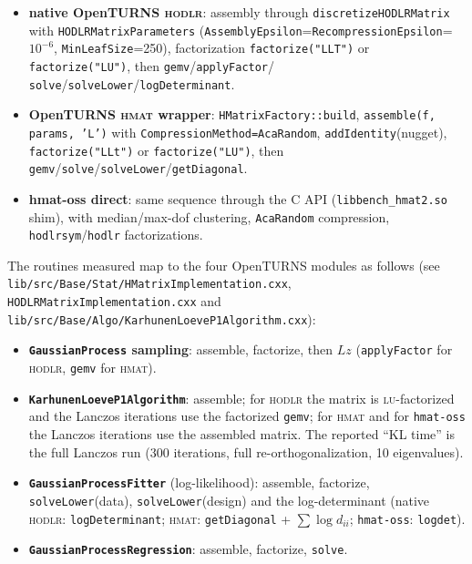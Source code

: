 \documentclass[11pt]{article}
\newcommand{\ot}{OpenTURNS}
\begin{document}
\begin{itemize}
  \item \textbf{native \ot{} \textsc{hodlr}}: assembly through
        \texttt{discretizeHODLRMatrix} with \texttt{HODLRMatrixParameters}
        (\texttt{AssemblyEpsilon}=\texttt{RecompressionEpsilon}=$10^{-6}$,
        \texttt{MinLeafSize}=250), factorization \texttt{factorize("LLT")} or
        \texttt{factorize("LU")}, then \texttt{gemv}/\texttt{applyFactor}/
        \texttt{solve}/\texttt{solveLower}/\texttt{logDeterminant}.
  \item \textbf{\ot{} \textsc{hmat} wrapper}: \texttt{HMatrixFactory::build},
        \texttt{assemble(f, params, 'L')} with
        \texttt{CompressionMethod=AcaRandom}, \texttt{addIdentity}(nugget),
        \texttt{factorize("LLt")} or \texttt{factorize("LU")}, then
        \texttt{gemv}/\texttt{solve}/\texttt{solveLower}/\texttt{getDiagonal}.
  \item \textbf{hmat-oss direct}: same sequence through the C API
        (\texttt{libbench\_hmat2.so} shim), with median/max-dof clustering,
        \texttt{AcaRandom} compression, \texttt{hodlrsym}/\texttt{hodlr}
        factorizations.
\end{itemize}

The routines measured map to the four \ot{} modules as follows
(see \texttt{lib/src/Base/Stat/HMatrixImplementation.cxx},
\texttt{HODLRMatrixImplementation.cxx} and
\texttt{lib/src/Base/Algo/KarhunenLoeveP1Algorithm.cxx}):

\begin{itemize}
  \item \textbf{\texttt{GaussianProcess} sampling}: assemble, factorize, then
        $L z$ (\texttt{applyFactor} for \textsc{hodlr}, \texttt{gemv} for
        \textsc{hmat}).
  \item \textbf{\texttt{KarhunenLoeveP1Algorithm}}: assemble; for
        \textsc{hodlr} the matrix is \textsc{lu}-factorized and the Lanczos
        iterations use the factorized \texttt{gemv}; for \textsc{hmat} and for
        \texttt{hmat-oss} the Lanczos iterations use the assembled matrix.
        The reported ``KL time'' is the full Lanczos run (300 iterations,
        full re-orthogonalization, 10 eigenvalues).
  \item \textbf{\texttt{GaussianProcessFitter}} (log-likelihood): assemble,
        factorize, \texttt{solveLower}(data), \texttt{solveLower}(design) and
        the log-determinant (native \textsc{hodlr}: \texttt{logDeterminant};
        \textsc{hmat}: \texttt{getDiagonal} + $\sum\log d_{ii}$;
        \texttt{hmat-oss}: \texttt{logdet}).
  \item \textbf{\texttt{GaussianProcessRegression}}: assemble, factorize,
        \texttt{solve}.
\end{itemize}
\end{document}
